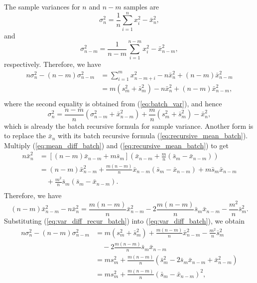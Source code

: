 \documentclass{article}
\begin{document}
The sample variances for $n$ and $n-m$ samples are
\begin{equation}
  \sigma_n^2
  =\frac{1}{n}\sum_{i=1}^nx_i^2-\bar{x}_n^2,
\end{equation}
and
\begin{equation}
  \sigma_{n-m}^2
  =\frac{1}{n-m}\sum_{i=1}^{n-m}x_i^2-\bar{x}_{n-m}^2,
\end{equation}
respectively. Therefore, we have
\begin{equation}
  \label{eq:var_diff_batch}
  \begin{aligned}
    n\sigma_n^2-(n-m)\sigma_{n-m}^2
    &=\sum_{i=1}^m x_{n-m+i}^2-n\bar{x}_n^2+(n-m)\bar{x}_{n-m}^2\\
    &=m(s_m^2+\bar{s}_m^2)-n\bar{x}_n^2+(n-m)\bar{x}_{n-m}^2,\\
  \end{aligned}
\end{equation}
where the second equality is obtained from (\ref{eq:batch_var}), and hence
\begin{equation}
  \sigma_n^2=\frac{n-m}{n}(\sigma_{n-m}^2+\bar{x}_{n-m}^2)+\frac{m}{n}(s_m^2+\bar{s}_m^2)-\bar{x}_n^2,
\end{equation}
which is already the batch recursive formula for sample variance. Another form is to replace the $\bar{x}_n$ with its batch recursive formula (\ref{eq:recursive_mean_batch}). Multiply (\ref{eq:mean_diff_batch}) and (\ref{eq:recursive_mean_batch}) to get
\begin{equation}
  \begin{aligned}
    n\bar{x}_n^2
    &=[(n-m)\bar{x}_{n-m}+m\bar{s}_m]\left(\bar{x}_{n-m}+\frac{m}{n}(\bar{s}_m-\bar{x}_{n-m})\right)\\
    &=(n-m)\bar{x}_{n-m}^2+\frac{m(n-m)}{n}\bar{x}_{n-m}(\bar{s}_m-\bar{x}_{n-m})+m\bar{s}_m\bar{x}_{n-m}\\
    &\quad+\frac{m^2}{n}\bar{s}_m(\bar{s}_m-\bar{x}_{n-m}).\\
  \end{aligned}
\end{equation}
Therefore, we have
\begin{equation}
  \label{eq:var_diff_recur_batch}
  (n-m)\bar{x}_{n-m}^2-n\bar{x}_n^2
  =\frac{m(n-m)}{n}\bar{x}_{n-m}^2-2\frac{m(n-m)}{n}\bar{s}_m\bar{x}_{n-m}-\frac{m^2}{n}\bar{s}_m^2.
\end{equation}
Substituting (\ref{eq:var_diff_recur_batch}) into (\ref{eq:var_diff_batch}), we obtain
\begin{equation}
  \begin{aligned}
    n\sigma_n^2-(n-m)\sigma_{n-m}^2
    &=m(s_m^2+\bar{s}_m^2)+\frac{m(n-m)}{n}\bar{x}_{n-m}^2-\frac{m^2}{n}\bar{s}_m^2\\
    &\quad-2\frac{m(n-m)}{n}\bar{s}_m\bar{x}_{n-m}\\
    &=ms_m^2+\frac{m(n-m)}{n}(\bar{s}_m^2-2\bar{s}_m\bar{x}_{n-m}+\bar{x}_{n-m}^2)\\
    &=ms_m^2+\frac{m(n-m)}{n}(\bar{s}_m-\bar{x}_{n-m})^2,
  \end{aligned}
\end{equation}
\end{document}
